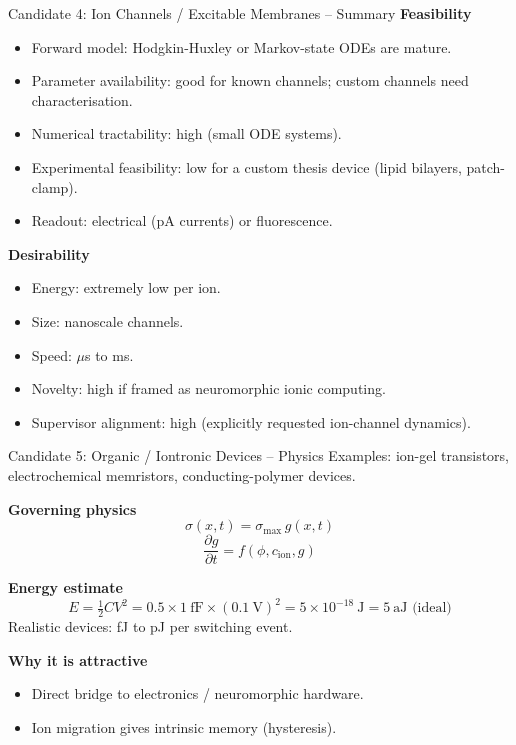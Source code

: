 \documentclass[aspectratio=169,11pt]{beamer}
\begin{document}
\begin{frame}{Candidate 4: Ion Channels / Excitable Membranes -- Summary}
  \small
  \textbf{Feasibility}
  \begin{itemize}
    \item Forward model: Hodgkin-Huxley or Markov-state ODEs are mature.
    \item Parameter availability: good for known channels; custom channels need characterisation.
    \item Numerical tractability: high (small ODE systems).
    \item Experimental feasibility: low for a custom thesis device (lipid bilayers, patch-clamp).
    \item Readout: electrical (pA currents) or fluorescence.
  \end{itemize}

  \vspace{0.1cm}
  \textbf{Desirability}
  \begin{itemize}
    \item Energy: extremely low per ion.
    \item Size: nanoscale channels.
    \item Speed: $\mu$s to ms.
    \item Novelty: high if framed as neuromorphic ionic computing.
    \item Supervisor alignment: high (explicitly requested ion-channel dynamics).
  \end{itemize}
\end{frame}

\begin{frame}{Candidate 5: Organic / Iontronic Devices -- Physics}
  \small
  Examples: ion-gel transistors, electrochemical memristors, conducting-polymer devices.

  \vspace{0.15cm}
  \textbf{Governing physics}
  \[
    \sigma(x,t) = \sigma_{\text{max}}\, g(x,t)
  \]
  \[
    \frac{\partial g}{\partial t} = f(\phi, c_{\text{ion}}, g)
  \]

  \vspace{0.15cm}
  \textbf{Energy estimate}
  \[
    E = \tfrac{1}{2} C V^2 = 0.5 \times 1\ \text{fF} \times (0.1\ \text{V})^2 = 5 \times 10^{-18}\ \text{J} = 5\ \text{aJ (ideal)}
  \]
  Realistic devices: fJ to pJ per switching event.

  \vspace{0.1cm}
  \textbf{Why it is attractive}
  \begin{itemize}
    \item Direct bridge to electronics / neuromorphic hardware.
    \item Ion migration gives intrinsic memory (hysteresis).
  \end{itemize}
\end{frame}
\end{document}
